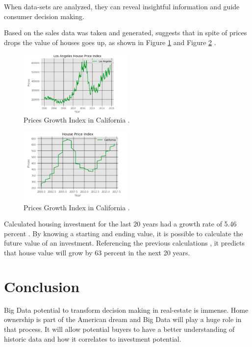 \documentclass[sigconf]{acmart}
\begin{document}
When data-sets are analyzed, they can reveal insightful information and guide consumer decision making.

Based on the sales data was taken and generated, suggests that in spite of prices drops the value of houses goes up, as shown in Figure \ref{fig:figure13} and Figure \ref{fig:figure14} \cite{md}.

\begin{figure}
  \centering
  \includegraphics[width=0.5\textwidth]{images/figure13.png}
  \caption{Prices Growth Index in California \cite{md}.} \label{fig:figure13} 
\end{figure}

\begin{figure}
  \centering
  \includegraphics[width=0.5\textwidth]{images/figure14.png}
  \caption{Prices Growth Index in California \cite{md}.} \label{fig:figure14} 
\end{figure}

Calculated housing investment for the last 20 years had a growth rate of 5.46 percent \cite{md}. By knowing a starting and ending value, it is possible to calculate the future value of an investment. Referencing the previous calculations \cite{md}, it predicts that house value will grow by 63 percent in the next 20 years.

\section{Conclusion}

Big Data potential to transform decision making in real-estate is immense. Home ownership is part of the American dream and Big Data will play a huge role in that process. It will allow potential buyers to have a better understanding of historic data and how it correlates to investment potential.
\end{document}
